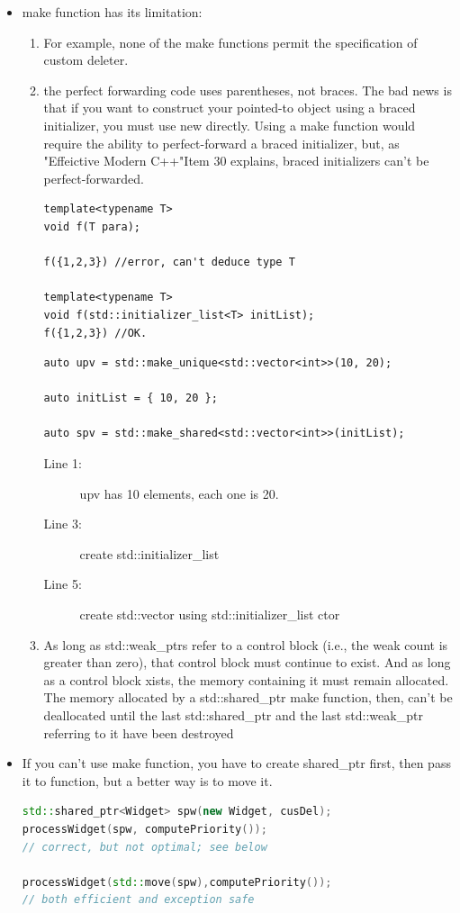 \documentclass[a4paper,11pt,twoside]{book}
\begin{document}
\begin{itemize}
\begin{enumerate}
	\end{enumerate}
	
	\item make function has its limitation:
	\begin{enumerate}
		\item For example, none of the make functions permit the specification of custom deleter.
		
		\item the perfect forwarding code uses parentheses, not braces. The bad news is that if you want to construct your pointed-to object using a braced initializer, you must use new directly. Using a make function would require the ability to perfect-forward a braced initializer, but, as "Effeictive Modern C++"Item 30 explains, braced initializers can't be perfect-forwarded.
\begin{lstlisting}
template<typename T>
void f(T para);

f({1,2,3}) //error, can't deduce type T

template<typename T>
void f(std::initializer_list<T> initList);
f({1,2,3}) //OK.
\end{lstlisting}

\begin{lstlisting}
auto upv = std::make_unique<std::vector<int>>(10, 20);

auto initList = { 10, 20 };

auto spv = std::make_shared<std::vector<int>>(initList);
\end{lstlisting}
\begin{description}
	\item[Line 1:] upv has 10 elements, each one is 20.
	\item[Line 3:] create std::initializer\_list
	\item[Line 5:] create std::vector using std::initializer\_list ctor
\end{description}
		
		\item As long as std::weak\_ptrs refer to a control block (i.e., the weak count is greater than zero), that control block must continue to exist. And as long as a control block xists, the memory containing it must remain allocated. The memory allocated by a std::shared\_ptr make function, then, can't be deallocated until the last std::shared\_ptr and the last std::weak\_ptr referring to it have been destroyed
	\end{enumerate}
	
	\item If you can't use make function, you have to create shared\_ptr first, then pass it to function, but a better way is to move it.
\begin{lstlisting}[frame=single, language=c++]
std::shared_ptr<Widget> spw(new Widget, cusDel);
processWidget(spw, computePriority()); 
// correct, but not optimal; see below

processWidget(std::move(spw),computePriority());  
// both efficient and exception safe
\end{lstlisting}
	
\end{itemize}
\end{document}
